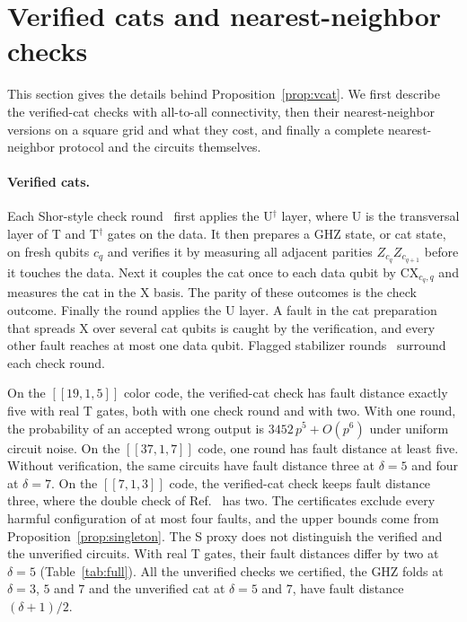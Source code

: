 \documentclass[aps,prl,reprint,twocolumn,amsmath,amssymb,floatfix,nofootinbib,superscriptaddress]{revtex4-2}
\theoremstyle{definition}
\theoremstyle{remark}
\begin{document}
\section{Verified cats and nearest-neighbor checks}\label{sm:nn}
This section gives the details behind Proposition~\ref{prop:vcat}. We first describe the verified-cat checks with all-to-all connectivity, then their nearest-neighbor versions on a square grid and what they cost, and finally a complete nearest-neighbor protocol and the circuits themselves.

\paragraph*{Verified cats.}
Each Shor-style check round~\cite{shor} first applies the U$^\dagger$ layer, where U is the transversal layer of T and T$^\dagger$ gates on the data. It then prepares a GHZ state, or cat state, on fresh qubits $c_q$ and verifies it by measuring all adjacent parities $Z_{c_q}Z_{c_{q+1}}$ before it touches the data. Next it couples the cat once to each data qubit by $\mathrm{CX}_{c_q,q}$ and measures the cat in the X basis. The parity of these outcomes is the check outcome. Finally the round applies the U layer. A fault in the cat preparation that spreads X over several cat qubits is caught by the verification, and every other fault reaches at most one data qubit. Flagged stabilizer rounds~\cite{chaoreichardt} surround each check round.

On the $[[19,1,5]]$ color code, the verified-cat check has fault distance exactly five with real T gates, both with one check round and with two. With one round, the probability of an accepted wrong output is $3452\,p^5+O(p^6)$ under uniform circuit noise. On the $[[37,1,7]]$ code, one round has fault distance at least five. Without verification, the same circuits have fault distance three at $\delta=5$ and four at $\delta=7$. On the $[[7,1,3]]$ code, the verified-cat check keeps fault distance three, where the double check of Ref.~\cite{cultivation} has two. The certificates exclude every harmful configuration of at most four faults, and the upper bounds come from Proposition~\ref{prop:singleton}. The S proxy does not distinguish the verified and the unverified circuits. With real T gates, their fault distances differ by two at $\delta=5$ (Table~\ref{tab:full}). All the unverified checks we certified, the GHZ folds at $\delta=3$, $5$ and $7$ and the unverified cat at $\delta=5$ and $7$, have fault distance $(\delta+1)/2$.
\end{document}
